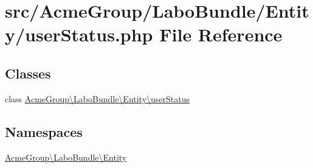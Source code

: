 \hypertarget{user_status_8php}{\section{src/\+Acme\+Group/\+Labo\+Bundle/\+Entity/user\+Status.php File Reference}
\label{user_status_8php}
}
\subsection*{Classes}
\begin{DoxyCompactItemize}
\item 
class \hyperlink{class_acme_group_1_1_labo_bundle_1_1_entity_1_1user_status}{Acme\+Group\textbackslash{}\+Labo\+Bundle\textbackslash{}\+Entity\textbackslash{}user\+Status}
\end{DoxyCompactItemize}
\subsection*{Namespaces}
\begin{DoxyCompactItemize}
\item 
 \hyperlink{namespace_acme_group_1_1_labo_bundle_1_1_entity}{Acme\+Group\textbackslash{}\+Labo\+Bundle\textbackslash{}\+Entity}
\end{DoxyCompactItemize}
